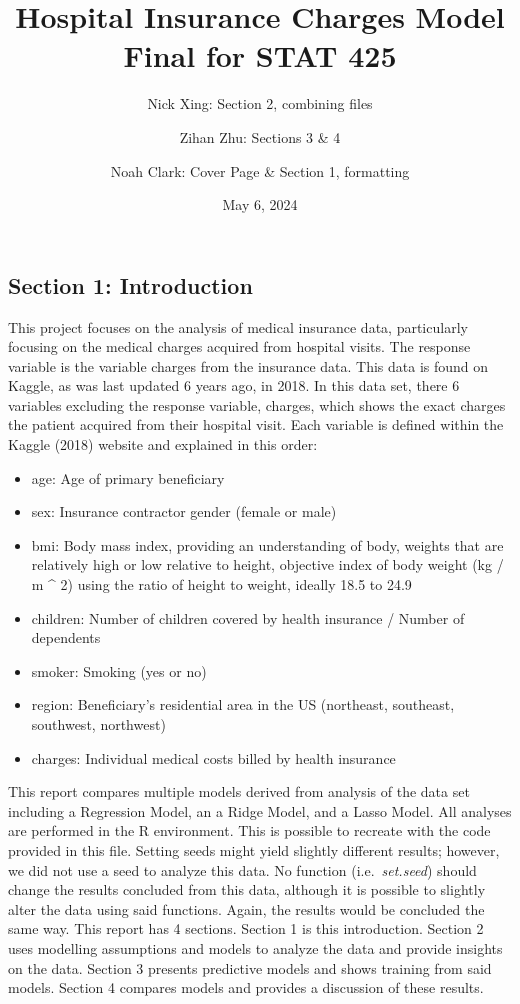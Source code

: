 \documentclass[
  12pt,
]{article}
\title{Hospital Insurance Charges Model \vspace{0.5cm}\\
Final for STAT 425}
\author{Nick Xing: Section 2, combining files \and Zihan Zhu: Sections 3
\& 4 \and Noah Clark: Cover Page \& Section 1, formatting}
\date{May 6, 2024}
\begin{document}
\maketitle

{
\setcounter{tocdepth}{3}
\tableofcontents
}
\newpage

\subsection{Section 1: Introduction}\label{section-1-introduction}

This project focuses on the analysis of medical insurance data,
particularly focusing on the medical charges acquired from hospital
visits. The response variable is the variable charges from the insurance
data. This data is found on Kaggle, as was last updated 6 years ago, in
2018. In this data set, there 6 variables excluding the response
variable, charges, which shows the exact charges the patient acquired
from their hospital visit. Each variable is defined within the Kaggle
(2018) website and explained in this order:

\begin{itemize}
\item
  age: Age of primary beneficiary
\item
  sex: Insurance contractor gender (female or male)
\item
  bmi: Body mass index, providing an understanding of body, weights that
  are relatively high or low relative to height, objective index of body
  weight (kg / m \^{} 2) using the ratio of height to weight, ideally
  18.5 to 24.9
\item
  children: Number of children covered by health insurance / Number of
  dependents
\item
  smoker: Smoking (yes or no)
\item
  region: Beneficiary's residential area in the US (northeast,
  southeast, southwest, northwest)
\item
  charges: Individual medical costs billed by health insurance
\end{itemize}

This report compares multiple models derived from analysis of the data
set including a Regression Model, an a Ridge Model, and a Lasso Model.
All analyses are performed in the R environment. This is possible to
recreate with the code provided in this file. Setting seeds might yield
slightly different results; however, we did not use a seed to analyze
this data. No function (i.e.~\emph{set.seed}) should change the results
concluded from this data, although it is possible to slightly alter the
data using said functions. Again, the results would be concluded the
same way. This report has 4 sections. Section 1 is this introduction.
Section 2 uses modelling assumptions and models to analyze the data and
provide insights on the data. Section 3 presents predictive models and
shows training from said models. Section 4 compares models and provides
a discussion of these results.
\end{document}
